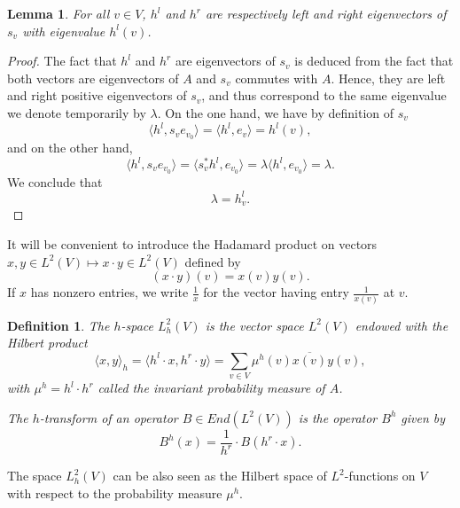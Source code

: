 \documentclass[10pt,11pt]{amsart}%
\newtheorem{definition}[theorem]{Definition}
\newtheorem{lemma}[theorem]{Lemma}
\begin{document}
\begin{lemma}\label{lem:Perron_sv}
For all $v\in V$, $h^l$ and $h^r$ are respectively left and right eigenvectors of $s_v$ with eigenvalue $h^l(v)$.
\end{lemma}
\begin{proof}
The fact that $h^l$ and $h^r$ are eigenvectors of $s_v$ is deduced from the fact that both vectors are eigenvectors of $A$ and $s_v$ commutes with $A$. Hence, they are left and right positive eigenvectors of $s_v$, and thus correspond to the same eigenvalue we denote temporarily by $\lambda$. On the one hand, we have by definition of $s_v$
$$\langle h^l,s_v e_{v_0}\rangle=\langle h^l,e_v\rangle=h^l(v),$$
and on the other hand,
$$\langle  h^l,s_v e_{v_0}\rangle=\langle s_v^*h^l,e_{v_0}\rangle=\lambda\langle h^l,e_{v_0}\rangle=\lambda.$$
We conclude that 
$$\lambda=h^l_v.$$
\end{proof}
It will be convenient to introduce the Hadamard product on vectors $x,y\in L^2(V)\mapsto x\cdot y\in L^2(V)$ defined by 
$$(x\cdot y)(v)=x(v)y(v).$$
If $x$ has nonzero entries, we write $\frac{1}{x}$ for the vector having entry $\frac{1}{x(v)}$ at $v$.
\begin{definition}\label{def:h_transform}
The $h$-space $L^2_h(V)$ is the vector space $L^2(V)$ endowed with the Hilbert product
$$\langle x,y\rangle_h=\langle h^l\cdot x,h^r\cdot y\rangle=\sum_{v\in V}\mu^h(v)\overline{x(v)}y(v),$$
with $\mu^h=h^l\cdot h^r$ called the invariant probability measure of $A$.

The $h$-transform of an operator $B\in End(L^2(V))$ is the operator $B^h$ given by 
$$B^h(x)=\frac{1}{h^r}\cdot B(h^r\cdot x).$$
\end{definition}
The space $L^2_h(V)$ can be also seen as the Hilbert space of $L^2$-functions on $V$ with respect to the probability measure $\mu^h$.
\end{document}
